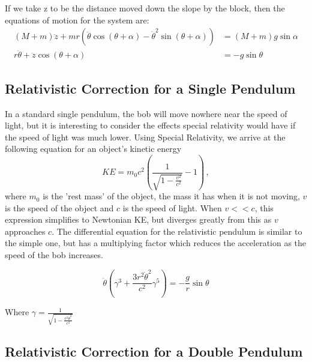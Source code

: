 \documentclass{article}
\begin{document}
 If we take z to be the distance moved down the slope by the block, then the equations of motion for the system are:
\begin{align*}
    (M + m) \ddot{z} + m r \left(\ddot{\theta} \cos{(\theta + \alpha)} - \dot{\theta}^2 \sin{(\theta + \alpha)} \right) &= (M + m) g \sin{\alpha} \\
    r \ddot{\theta} + \ddot{z} \cos{(\theta + \alpha)} &= -g \sin{\theta}
\end{align*}


\subsection{Relativistic Correction for a Single Pendulum}

In a standard single pendulum, the bob will move nowhere near the speed of light, but it is interesting to consider the effects special relativity would have if the speed of light was much lower. Using Special Relativity, we arrive at the following equation for an object's kinetic energy
$$ KE = m_{0} c^2 \left( \frac{1}{\sqrt{1 - \frac{v^2}{c^2}}} - 1 \right) \, ,$$
where \(m_{0} \) is the 'rest mass' of the object, the mass it has when it is not moving, \(v\) is the speed of the object and \(c\) is the speed of light. When  \( v << c\), this expression simplifies to Newtonian KE, but diverges greatly from this as \(v \) approaches \(c \). The differential equation for the relativistic pendulum is similar to the simple one, but has a multiplying factor which reduces the acceleration as the speed of the bob increases.

$$ \ddot{\theta} \left(\gamma ^3 + \frac{3r^2 \dot{\theta}^2}{c^2} \gamma ^5 \right) = -\frac{g}{r} \sin{\theta} $$
\begin{center}
Where \( \gamma = \frac{1}{\sqrt{1 - \frac{r^2 \dot{\theta}^2}{c^2}}} \)
\end{center}

\subsection{Relativistic Correction for a Double Pendulum}
\end{document}
